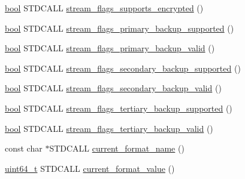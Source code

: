 \begin{DoxyCompactItemize}
\item 
\hyperlink{avb__gptp_8h_af6a258d8f3ee5206d682d799316314b1}{bool} S\+T\+D\+C\+A\+LL \hyperlink{classavdecc__lib_1_1stream__output__descriptor__response__imp_afc7e2cb300362fedc704d6f67ef30473}{stream\+\_\+flags\+\_\+supports\+\_\+encrypted} ()
\item 
\hyperlink{avb__gptp_8h_af6a258d8f3ee5206d682d799316314b1}{bool} S\+T\+D\+C\+A\+LL \hyperlink{classavdecc__lib_1_1stream__output__descriptor__response__imp_ae370f065c1e15a8a90f01e5cceb1d700}{stream\+\_\+flags\+\_\+primary\+\_\+backup\+\_\+supported} ()
\item 
\hyperlink{avb__gptp_8h_af6a258d8f3ee5206d682d799316314b1}{bool} S\+T\+D\+C\+A\+LL \hyperlink{classavdecc__lib_1_1stream__output__descriptor__response__imp_a2ac6e8f610d5624630dbad9d23501ca4}{stream\+\_\+flags\+\_\+primary\+\_\+backup\+\_\+valid} ()
\item 
\hyperlink{avb__gptp_8h_af6a258d8f3ee5206d682d799316314b1}{bool} S\+T\+D\+C\+A\+LL \hyperlink{classavdecc__lib_1_1stream__output__descriptor__response__imp_a82c7349d93a643ea02c489b6a78f32bc}{stream\+\_\+flags\+\_\+secondary\+\_\+backup\+\_\+supported} ()
\item 
\hyperlink{avb__gptp_8h_af6a258d8f3ee5206d682d799316314b1}{bool} S\+T\+D\+C\+A\+LL \hyperlink{classavdecc__lib_1_1stream__output__descriptor__response__imp_a1e029ab0cb65f681db424703165495f7}{stream\+\_\+flags\+\_\+secondary\+\_\+backup\+\_\+valid} ()
\item 
\hyperlink{avb__gptp_8h_af6a258d8f3ee5206d682d799316314b1}{bool} S\+T\+D\+C\+A\+LL \hyperlink{classavdecc__lib_1_1stream__output__descriptor__response__imp_ab5b0e24f5b6742e9e5a0dd301301de8f}{stream\+\_\+flags\+\_\+tertiary\+\_\+backup\+\_\+supported} ()
\item 
\hyperlink{avb__gptp_8h_af6a258d8f3ee5206d682d799316314b1}{bool} S\+T\+D\+C\+A\+LL \hyperlink{classavdecc__lib_1_1stream__output__descriptor__response__imp_a41e641d2e5f1e8d42146b7563fd48c5c}{stream\+\_\+flags\+\_\+tertiary\+\_\+backup\+\_\+valid} ()
\item 
const char $\ast$S\+T\+D\+C\+A\+LL \hyperlink{classavdecc__lib_1_1stream__output__descriptor__response__imp_a41ea895a8803b5e19ec9ebf1e6cc3a61}{current\+\_\+format\+\_\+name} ()
\item 
\hyperlink{parse_8c_aec6fcb673ff035718c238c8c9d544c47}{uint64\+\_\+t} S\+T\+D\+C\+A\+LL \hyperlink{classavdecc__lib_1_1stream__output__descriptor__response__imp_aab36b0610e422318dced082cf17d8d16}{current\+\_\+format\+\_\+value} ()
\item 

\end{DoxyCompactItemize}
